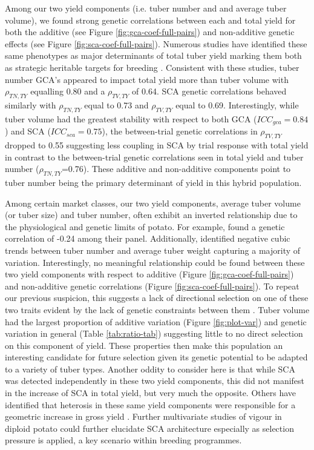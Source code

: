 Among our two yield components (i.e. tuber number and and average tuber volume), we found strong genetic correlations between each and total yield for both the additive (see Figure \ref{fig:gca-coef-full-pairs}) and non-additive genetic effects (see Figure \ref{fig:sca-coef-full-pairs}). Numerous studies have identified these same phenotypes as major determinants of total tuber yield marking them both as strategic heritable targets for breeding \citep{Khayatnezhad2011, Thompson1984}. Consistent with these studies, tuber number GCA's appeared to impact total yield more than tuber volume with \(\rho_{TN,TY}\) equalling 0.80 and a \(\rho_{TV,TY}\) of 0.64. SCA genetic correlations behaved similarly with \(\rho_{TN,TY}\) equal to 0.73 and \(\rho_{TV,TY}\) equal to 0.69. Interestingly, while tuber volume had the greatest stability with respect to both GCA (\(ICC_{gca}=0.84\)) and SCA (\(ICC_{sca}=0.75\)), the between-trial genetic correlations in \(\rho_{TV,TY}\) dropped to 0.55 suggesting less coupling in SCA by trial response with total yield in contrast to the between-trial genetic correlations seen in total yield and tuber number (\(\rho_{TN,TY}\)=0.76). These additive and non-additive components point to tuber number being the primary determinant of yield in this hybrid population.

Among certain market classes, our two yield components, average tuber volume (or tuber size) and tuber number, often exhibit an inverted relationship due to the physiological and genetic limits of potato. For example, \citep{Thompson1984} found a genetic correlation of -0.24 among their panel. Additionally, \citep{Lemaga1990} identified negative cubic trends between tuber number and average tuber weight capturing a majority of variation. Interestingly, no meaningful relationship could be found between these two yield components with respect to additive (Figure \ref{fig:gca-coef-full-pairs}) and non-additive genetic correlations (Figure \ref{fig:sca-coef-full-pairs}). To repeat our previous suspicion, this suggests a lack of directional selection on one of these two traits evident by the lack of genetic constraints between them \citep{Blows2009}. Tuber volume had the largest proportion of additive variation (Figure \ref{fig:plot-var}) and genetic variation in general (Table \ref{tab:ratio-tab}) suggesting little to no direct selection on this component of yield. These properties then make this population an interesting candidate for future selection given its genetic potential to be adapted to a variety of tuber types. Another oddity to consider here is that while SCA was detected independently in these two yield components, this did not manifest in the increase of SCA in total yield, but very much the opposite. Others have identified that heterosis in these same yield components were responsible for a geometric increase in gross yield \citep{Tarn1977}. Further multivariate studies of vigour in diploid potato could further elucidate SCA architecture especially as selection pressure is applied, a key scenario within breeding programmes.

